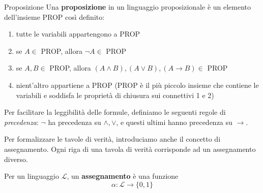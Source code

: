 \documentclass[a4paper,12pt]{report}
\begin{document}
\begin{defbox}{Proposizione}{}
    Una \textbf{proposizione} in un linguaggio proposizionale è un elemento dell'insieme PROP così definito:
    \begin{enumerate}
        \item tutte le variabili appartengono a PROP
        \item se \( A \in \) PROP, allora \( \neg A \in \) PROP
        \item se \( A, B \in \) PROP, allora \( (A \land B), (A \lor B), (A \to B) \in \) PROP
        \item nient'altro appartiene a PROP {\color{gray}(PROP è il più piccolo insieme che contiene le variabili e soddisfa le proprietà di chiusura sui connettivi 1 e 2)}
    \end{enumerate}
\end{defbox}

Per facilitare la leggibilità delle formule, definiamo le seguenti regole di \textit{precedenza}: \( \neg \) ha precedenza su \( \land, \lor \), e questi ultimi hanno precedenza su \( \to \).


Per formalizzare le tavole di verità, introduciamo anche il concetto di assegnamento. Ogni riga di una tavola di verità corrisponde ad un assegnamento diverso.

    Per un linguaggio \( \mathcal{L} \), un \textbf{assegnamento} è una funzione 
    \[
        \alpha : \mathcal{L} \to \{0, 1\}
    \]
\end{document}
